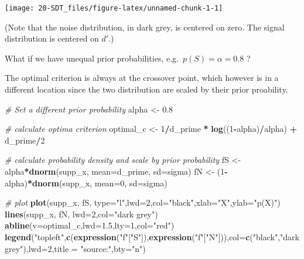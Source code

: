 \documentclass[
]{book}
\newenvironment{Shaded}{\begin{snugshade}}{\end{snugshade}}
\newcommand{\AttributeTok}[1]{\textcolor[rgb]{0.13,0.29,0.53}{#1}}
\newcommand{\CommentTok}[1]{\textcolor[rgb]{0.56,0.35,0.01}{\textit{#1}}}
\newcommand{\DecValTok}[1]{\textcolor[rgb]{0.00,0.00,0.81}{#1}}
\newcommand{\FloatTok}[1]{\textcolor[rgb]{0.00,0.00,0.81}{#1}}
\newcommand{\FunctionTok}[1]{\textcolor[rgb]{0.13,0.29,0.53}{\textbf{#1}}}
\newcommand{\NormalTok}[1]{#1}
\newcommand{\OtherTok}[1]{\textcolor[rgb]{0.56,0.35,0.01}{#1}}
\newcommand{\SpecialCharTok}[1]{\textcolor[rgb]{0.81,0.36,0.00}{\textbf{#1}}}
\newcommand{\StringTok}[1]{\textcolor[rgb]{0.31,0.60,0.02}{#1}}
\begin{document}
\begin{center}\texttt{[image: 20-SDT\_files/figure-latex/unnamed-chunk-1-1]} \end{center}

(Note that the noise distribution, in dark grey, is centered on zero. The signal distribution is centered on \(d'\).)

What if we have unequal prior probabilities, e.g.~\(p(S)=\alpha=0.8\) ?

The optimal criterion is always at the crossover point, which however is in a different location since the two distribution are scaled by their prior proability.

\begin{Shaded}
\begin{Highlighting}[]
\CommentTok{\# Set a different prior probability}
\NormalTok{alpha }\OtherTok{\textless{}{-}} \FloatTok{0.8}

\CommentTok{\# calculate optima criterion}
\NormalTok{optimal\_c }\OtherTok{\textless{}{-}} \DecValTok{1}\SpecialCharTok{/}\NormalTok{d\_prime }\SpecialCharTok{*} \FunctionTok{log}\NormalTok{((}\DecValTok{1}\SpecialCharTok{{-}}\NormalTok{alpha)}\SpecialCharTok{/}\NormalTok{alpha) }\SpecialCharTok{+}\NormalTok{ d\_prime}\SpecialCharTok{/}\DecValTok{2}

\CommentTok{\# calculate probability density and scale by prior probability}
\NormalTok{fS }\OtherTok{\textless{}{-}}\NormalTok{ alpha}\SpecialCharTok{*}\FunctionTok{dnorm}\NormalTok{(supp\_x, }\AttributeTok{mean=}\NormalTok{d\_prime, }\AttributeTok{sd=}\NormalTok{sigma)}
\NormalTok{fN }\OtherTok{\textless{}{-}}\NormalTok{ (}\DecValTok{1}\SpecialCharTok{{-}}\NormalTok{alpha)}\SpecialCharTok{*}\FunctionTok{dnorm}\NormalTok{(supp\_x, }\AttributeTok{mean=}\DecValTok{0}\NormalTok{, }\AttributeTok{sd=}\NormalTok{sigma)}

\CommentTok{\# plot }
\FunctionTok{plot}\NormalTok{(supp\_x, fS, }\AttributeTok{type=}\StringTok{"l"}\NormalTok{,}\AttributeTok{lwd=}\DecValTok{2}\NormalTok{,}\AttributeTok{col=}\StringTok{"black"}\NormalTok{,}\AttributeTok{xlab=}\StringTok{"X"}\NormalTok{,}\AttributeTok{ylab=}\StringTok{"p(X)"}\NormalTok{)}
\FunctionTok{lines}\NormalTok{(supp\_x, fN, }\AttributeTok{lwd=}\DecValTok{2}\NormalTok{,}\AttributeTok{col=}\StringTok{"dark grey"}\NormalTok{)}
\FunctionTok{abline}\NormalTok{(}\AttributeTok{v=}\NormalTok{optimal\_c,}\AttributeTok{lwd=}\FloatTok{1.5}\NormalTok{,}\AttributeTok{lty=}\DecValTok{1}\NormalTok{,}\AttributeTok{col=}\StringTok{"red"}\NormalTok{)}
\FunctionTok{legend}\NormalTok{(}\StringTok{"topleft"}\NormalTok{,}\FunctionTok{c}\NormalTok{(}\FunctionTok{expression}\NormalTok{(}\StringTok{"f"}\NormalTok{[}\StringTok{"S"}\NormalTok{]),}\FunctionTok{expression}\NormalTok{(}\StringTok{"f"}\NormalTok{[}\StringTok{"N"}\NormalTok{])),}\AttributeTok{col=}\FunctionTok{c}\NormalTok{(}\StringTok{"black"}\NormalTok{,}\StringTok{"dark grey"}\NormalTok{),}\AttributeTok{lwd=}\DecValTok{2}\NormalTok{,}\AttributeTok{title =} \StringTok{"source:"}\NormalTok{,}\AttributeTok{bty=}\StringTok{"n"}\NormalTok{)}
\end{Highlighting}
\end{Shaded}
\end{document}
